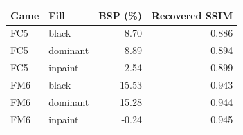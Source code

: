\begin{tabular}{@{}llrr@{}}
\toprule
\textbf{Game} & \textbf{Fill} & \textbf{BSP (\%)} & \textbf{Recovered SSIM} \\
\midrule
FC5 & black & 8.70 & 0.886 \\
FC5 & dominant & 8.89 & 0.894 \\
FC5 & inpaint & -2.54 & 0.899 \\
\midrule
FM6 & black & 15.53 & 0.943 \\
FM6 & dominant & 15.28 & 0.944 \\
FM6 & inpaint & -0.24 & 0.945 \\
\bottomrule
\end{tabular}
